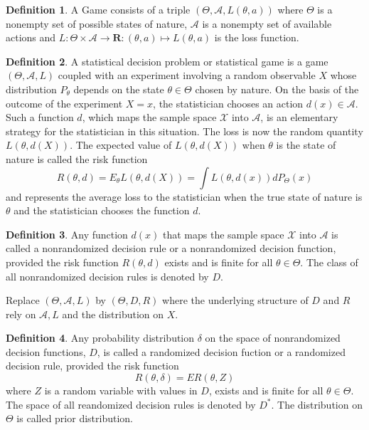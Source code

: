 \documentclass{scrartcl}
\theoremstyle{definition}
\newtheorem{definition}{Definition}
\theoremstyle{theorem}
\begin{document}
	\begin{definition}
		A Game consists of a triple $(\Theta,\mathcal{A},L(\theta,a))$ where $\Theta$ is a nonempty set of possible states of nature, $\mathcal{A}$ is a nonempty set of available actions and $L: \Theta\times \mathcal{A}\to \mathbf{R}: (\theta,a)\mapsto L(\theta,a)$ is the loss function.
	\end{definition}

\begin{definition}
	A statistical decision problem or statistical game is a game $(\Theta,\mathcal{A},L)$ coupled with an experiment involving a random observable $X$ whose distribution $P_\theta$ depends on the state $\theta\in\Theta$ chosen by nature. On the basis of the outcome of the experiment $X=x$, the statistician chooses an action $d(x)\in \mathcal{A}$. Such a function $d$, which maps the sample space $\mathcal{X}$ into $\mathcal{A}$, is an elementary strategy for the statistician in this situation. The loss is now the random quantity $L(\theta,d(X))$. The expected value of $L(\theta,d(X))$ when $\theta$ is the state of nature is called the risk function
	\[
	R(\theta,d)=E_\theta L(\theta,d(X))=\int L(\theta,d(x))dP_\Theta(x)	
	\]
	and represents the average loss to the statistician when the true state of nature is $\theta$ and the statistician chooses the function $d$.
\end{definition}

\begin{definition}
	Any function $d(x)$ that maps the sample space $\mathcal{X}$ into $\mathcal{A}$ is called a nonrandomized decision rule or a nonrandomized decision function, provided the risk function $R(\theta,d)$ exists and is finite for all $\theta\in \Theta$. The class of all nonrandomized decision rules is denoted by $D$.
\end{definition}

Replace $(\Theta,\mathcal{A},L)$ by $(\Theta,D,R)$ where the underlying structure of $D$ and $R$ rely on $\mathcal{A}, L$ and the distribution on $X$.

\begin{definition}
	Any probability distribution $\delta$ on the space of nonrandomized decision functions, $D$, is called a randomized decision fuction or a randomized decision rule, provided the risk function
	\[
	R(\theta,\delta)=ER(\theta,Z)
	\]
	where $Z$ is a random variable with values in $D$, exists and is finite for all $\theta\in \Theta$. The space of all reandomized decision rules is denoted by $D^\ast$. The distribution on $\Theta$ is called prior distribution.
\end{definition}
\end{document}
